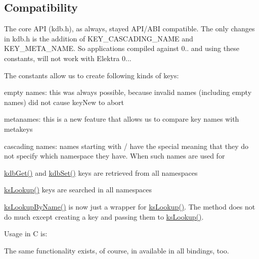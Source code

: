 \subsection*{Compatibility}

The core A\+PI (kdb.\+h), as always, stayed A\+P\+I/\+A\+BI compatible. The only changes in kdb.\+h is the addition of K\+E\+Y\+\_\+\+C\+A\+S\+C\+A\+D\+I\+N\+G\+\_\+\+N\+A\+ME and K\+E\+Y\+\_\+\+M\+E\+T\+A\+\_\+\+N\+A\+ME. So applications compiled against 0.. and using these constants, will not work with Elektra 0...

The constants allow us to create following kinds of keys\+:


\begin{DoxyItemize}
\item empty names\+: this was always possible, because invalid names (including empty names) did not cause key\+New to abort
\item metanames\+: this is a new feature that allows us to compare key names with metakeys
\item cascading names\+: names starting with / have the special meaning that they do not specify which namespace they have. When such names are used for
\begin{DoxyItemize}
\item \hyperlink{group__kdb_ga28e385fd9cb7ccfe0b2f1ed2f62453a1}{kdb\+Get()} and \hyperlink{group__kdb_ga11436b058408f83d303ca5e996832bcf}{kdb\+Set()} keys are retrieved from all namespaces
\item \hyperlink{group__keyset_gaa34fc43a081e6b01e4120daa6c112004}{ks\+Lookup()} keys are searched in all namespaces
\item \hyperlink{group__keyset_gad2e30fb6d4739d917c5abb2ac2f9c1a1}{ks\+Lookup\+By\+Name()} is now just a wrapper for \hyperlink{group__keyset_gaa34fc43a081e6b01e4120daa6c112004}{ks\+Lookup()}. The method does not do much except creating a key and passing them to \hyperlink{group__keyset_gaa34fc43a081e6b01e4120daa6c112004}{ks\+Lookup()}.
\end{DoxyItemize}
\end{DoxyItemize}

Usage in C is\+: 


The same functionality exists, of course, in available in all bindings, too.

